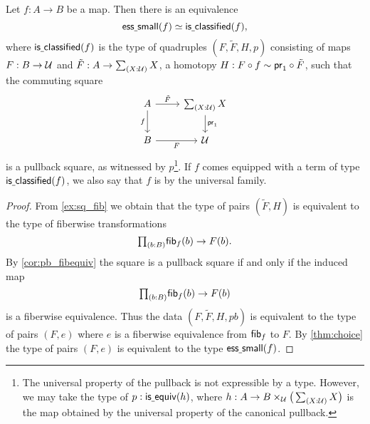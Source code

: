 \begin{thm}\label{thm:classifier}
Let $f:A\to B$ be a map. Then there is an equivalence
\begin{equation*}
\eqv{\esssmall(f)}{\isclassified(f)},
\end{equation*}
where $\mathsf{is\underline{\ }{}classified}(f)$ is the type of quadruples $(F,\tilde{F},H,p)$ consisting of maps
$F:B\to \mathcal{U}$ and $\tilde{F}:A\to \sm{X:\UU}X$, a homotopy $H:F\circ f\sim \mathsf{pr}_{1}\circ \tilde{F}$,  such that the commuting square
\begin{equation*}
\begin{tikzcd}
A \arrow[r,"\tilde{F}"] \arrow[d,swap,"f"] & \sm{X:\UU}X \arrow[d,"\proj 1"] \\
B \arrow[r,swap,"F"] & \UU
\end{tikzcd}
\end{equation*}
is a pullback square, as witnessed by $p$\footnote{The universal property of the pullback is not expressible by a type. However, we may take the type of $p:\mathsf{is\underline{\ }{}equiv}(h)$, where $h:A\to B\times_\UU\big(\sm{X:\UU}X\big)$ is the map obtained by the universal property of the canonical pullback.}. If $f$ comes equipped with a term of type $\mathsf{is\underline{\ }{}classified}(f)$, we also say that $f$ is  by the universal family. 
\end{thm}

\begin{proof}
From \cref{ex:sq_fib} we obtain that the type of pairs $(\tilde{F},H)$ is equivalent to the type of fiberwise transformations
\begin{equation*}
\prd{b:B}\fib{f}{b}\to F(b).
\end{equation*}
By \cref{cor:pb_fibequiv} the square is a pullback square if and only if the induced map
\begin{equation*}
\prd{b:B}\fib{f}{b}\to F(b)
\end{equation*}
is a fiberwise equivalence. Thus the data $(F,\tilde{F},H,pb)$ is equivalent to the type of pairs $(F,e)$ where $e$ is a fiberwise equivalence from $\mathsf{fib}_{f}$ to $F$. By \cref{thm:choice} the type of pairs $(F,e)$ is equivalent to the type $\mathsf{ess\underline{\ }{}small}(f)$. 
\end{proof}

